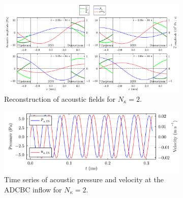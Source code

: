 \begin{figure}[t]
\centering
\begin{subfigure}{0.99\textwidth}
\centering
\includegraphics[scale=0.30]{assets/graphs/ac-plot-3-4_long.pdf}
\caption{Reconstruction of acoustic fields for $N_κ = 2$.}
\label{fig:ac-wave-later}
\end{subfigure}

\vspace*{0.5em}

\begin{subfigure}{0.99\textwidth}
\centering
\includegraphics[scale=0.35]{assets/graphs/up_plot_wave.pdf}
\caption{Time series of acoustic pressure and velocity at the ADCBC inflow for $N_κ = 2$.}
\label{fig:up_plot_wave}
\end{subfigure}
\caption{}
\label{fig:wave-later}
\end{figure}

